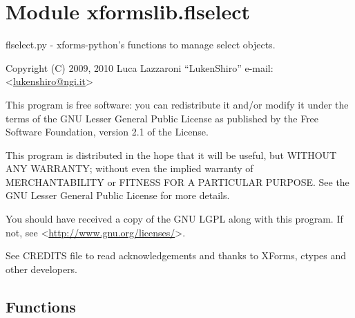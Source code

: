 %
%
%


\section{Module xformslib.flselect}

    \label{xformslib:flselect}

flselect.py - xforms-python's functions to manage select objects.

Copyright (C) 2009, 2010  Luca Lazzaroni ``LukenShiro''
e-mail: <\href{mailto:lukenshiro@ngi.it}{lukenshiro@ngi.it}>

This program is free software: you can redistribute it and/or modify
it under the terms of the GNU Lesser General Public License as
published by the Free Software Foundation, version 2.1 of the License.

This program is distributed in the hope that it will be useful,
but WITHOUT ANY WARRANTY; without even the implied warranty of
MERCHANTABILITY or FITNESS FOR A PARTICULAR PURPOSE. See the
GNU Lesser General Public License for more details.

You should have received a copy of the GNU LGPL along with this
program. If not, see <\href{http://www.gnu.org/licenses/}{http://www.gnu.org/licenses/}>.

See CREDITS file to read acknowledgements and thanks to XForms,
ctypes and other developers.


  \subsection{Functions}

    \label{xformslib:flselect:fl_add_select}

